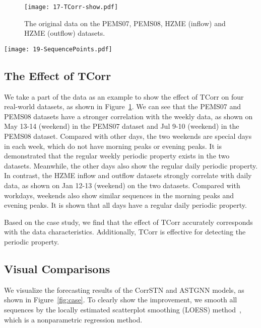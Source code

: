 \documentclass[sn-mathphys,iicol]{sn-jnl}
\newcommand\figref[1]{Figure~\ref{#1}}
\theoremstyle{thmstyleone}\newtheorem{theorem}{Theorem}\newtheorem{proposition}[theorem]{Proposition}
\theoremstyle{thmstyletwo}\newtheorem{example}{Example}\newtheorem{remark}{Remark}
\theoremstyle{thmstylethree}\newtheorem{definition}{Definition}
\begin{document}
\begin{figure}[t]
\centering
\texttt{[image: 17-TCorr-show.pdf]}
\caption{The original data on the PEMS07, PEMS08, HZME (inflow) and HZME (outflow) datasets.}
\label{fig:TCorr-show}
\end{figure}

 \begin{figure*}[!t]
 \centering
 \texttt{[image: 19-SequencePoints.pdf]}
 \caption{Visualizations on four real-world datasets.}
 \label{fig:case}
 \end{figure*}

\subsection{The Effect of TCorr}
\label{sec:TCorr-case-study}


We take a part of the data as an example to show the effect of TCorr on four real-world datasets, as shown in \figref{fig:TCorr-show}. We can see that the PEMS07 and PEMS08 datasets have a stronger correlation with the weekly data, as shown on May 13-14 (weekend) in the PEMS07 dataset and Jul 9-10 (weekend) in the PEMS08 dataset. Compared with other days, the two weekends are special days in each week, which do not have morning peaks or evening peaks. It is demonstrated that the regular weekly periodic property exists in the two datasets. Meanwhile, the other days also show the regular daily periodic property. In contrast, the HZME inflow and outflow datasets strongly correlate with daily data, as shown on Jan 12-13 (weekend) on the two datasets. Compared with workdays, weekends also show similar sequences in the morning peaks and evening peaks. It is shown that all days have a regular daily periodic property. 

Based on the case study, we find that the effect of TCorr accurately corresponds with the data characteristics. Additionally, TCorr is effective for detecting the periodic property.










\subsection{Visual Comparisons}
We visualize the forecasting results of the CorrSTN and ASTGNN models, as shown in \figref{fig:case}. To clearly show the improvement, we smooth all sequences by the locally estimated scatterplot smoothing (LOESS) method~\cite{Cleveland:1979}, which is a nonparametric regression method.
\end{document}
